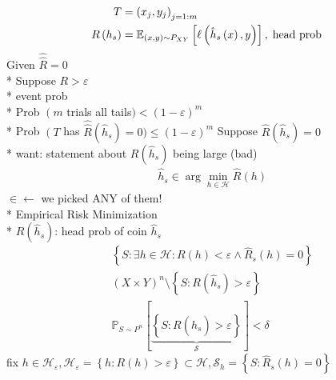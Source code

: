 \documentclass{article}
\begin{document}
\begin{align*}
T  &= \left(x_{j}, y_{j}\right)_{j = 1:m}
\\ R\left(h_{s}\right)  &= \mathbb{E}_{\left(x, y\right) \sim  P_{X Y}}\left[\ell\left(\hat{h}_{s}\left(x\right), y\right)\right], \text{\;head prob\;}
\end{align*}
Given $\hat{\hat{R}} = 0$
\\* Suppose $R  > \varepsilon$
\\* event prob
\\* Prob $\left(m \right.$ trials all tails$) < \left(1 - \varepsilon\right)^{m}$
\\* Prob $\left(T \right.$ has $\hat{\hat{R}}\left(\hat{h}_{s}\right) = 0) \leq  \left(1 - \varepsilon\right)^{m}$
\newline \newline
Suppose $\hat{R}\left(\hat{h}_{s}\right) = 0$
\\* want: statement about $R\left(\hat{h}_{s}\right) $ being large (bad)
\begin{align*}
&\hat{h}_{s} \in \arg\displaystyle\min_{h \in \mathcal{H}} \hat{R}\left(h\right)
\end{align*}
$\in \leftarrow$ we picked ANY of them$!$
\\* Empirical Risk Minimization
\\* $R\left(\hat{h}_{s}\right) $: head prob of coin $\hat{h}_{s}$
\newline \newline
\begin{align*}
&\left\{S  : \exists h \in \mathcal{H} : R\left(h\right)  < \varepsilon \wedge \hat{R}_{s}\left(h\right) = 0\right\}
\\ &\left(X \times Y\right)^{n} \setminus  \left\{S  : R\left(\hat{h}_{s}\right) > \varepsilon\right\}
\\ &  \mathbb{P}_{S \sim  P^{n}}\left[\underbrace{\left\{S  : R\left(\hat{h}_{s}\right) > \varepsilon\right\}}_{\mathcal{S}}\right] < \delta
\end{align*}
fix $h  \in \mathcal{H}_{\varepsilon}, \mathcal{H}_{\varepsilon} = \left\{h : R\left(h\right) > \varepsilon\right\} \subset \mathcal{H}, \mathcal{S}_{h} = \left\{S: \hat{R}_{s}\left(h\right) = 0\right\}$
\newline \newline
\end{document}
